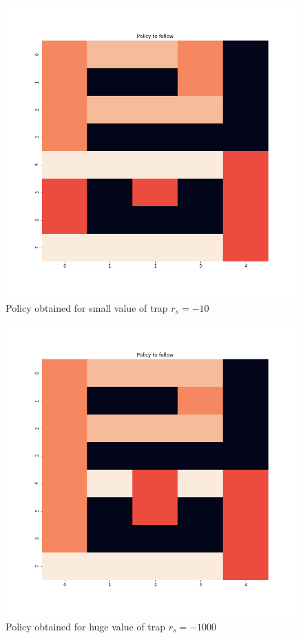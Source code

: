\documentclass[11pt]{article}
\begin{document}
\begin{multicols}{2}
\begin{figure}[H]
\centering
\includegraphics[scale =  0.2]{Policy_gw_10.png}
\caption{Policy obtained for small value of trap $r_s = -10$}
\end{figure}

\begin{figure}[H]
\centering
\includegraphics[scale =  0.2]{Policy_gw_1000.png}
\caption{Policy obtained for huge value of trap $r_s = -1000$}
\end{figure}


\end{multicols}
\end{document}
